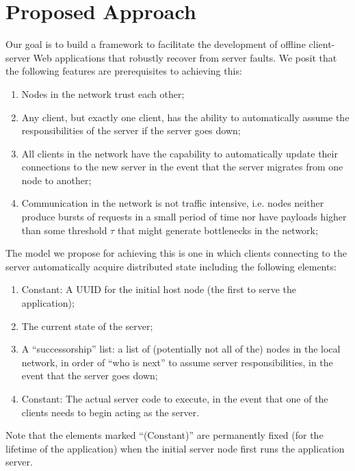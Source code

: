 \section{Proposed Approach}
\label{sec:approach}

Our goal is to build a framework to facilitate the development of offline client-server Web applications that robustly recover from server faults. 
We posit that the following features are prerequisites to achieving this:

\begin{enumerate}
    \item Nodes in the network trust each other;
    \item Any client, but exactly one client, has the ability to automatically assume the responsibilities of the server if the server goes down;
    \item All clients in the network have the capability to automatically update their connections to the new server in the event that the server migrates from one node to another;
    \item Communication in the network is not traffic intensive, i.e. nodes neither produce bursts of requests in a small period of time nor have payloads higher than some threshold $\tau$ that might generate bottlenecks in the network;
    
\end{enumerate}

The model we propose for achieving this is one in which clients connecting to the server automatically acquire distributed state including the following elements:

\begin{enumerate}
	\item Constant: A UUID for the initial host node (the first to serve the application);
    \item The current state of the server;
	\item A ``successorship'' list: a list of (potentially not all of the) nodes in the local network, in order of ``who is next'' to assume server responsibilities, in the event that the server goes down;
    \item Constant: The actual server code to execute, in the event that one of the clients needs to begin acting as the server.
\end{enumerate}

Note that the elements marked ``(Constant)'' are permanently fixed (for the lifetime of the application) when the initial server node first runs the application server.

